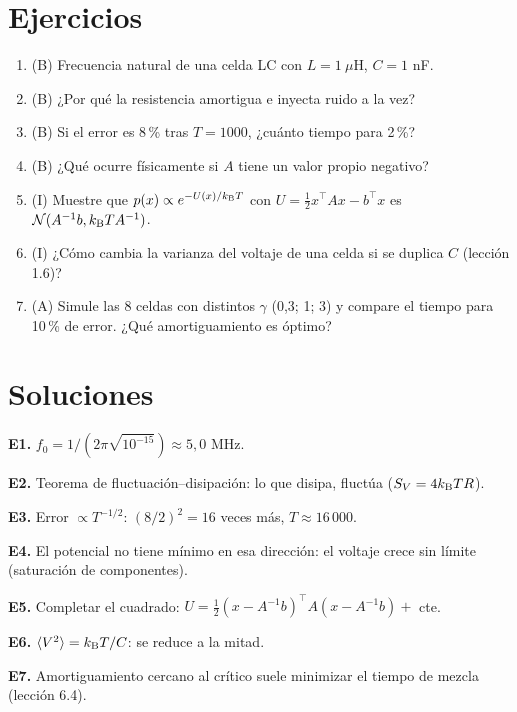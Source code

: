 \documentclass[11pt,a4paper]{article}
\begin{document}
\section{Ejercicios}
\begin{enumerate}[label=\textbf{E\arabic*.}]
\item (B) Frecuencia natural de una celda LC con $L=1\ \mu$H, $C=1$ nF.
\item (B) ¿Por qué la resistencia amortigua e inyecta ruido a la vez?
\item (B) Si el error es 8\,\% tras $T=1000$, ¿cuánto tiempo para 2\,\%?
\item (B) ¿Qué ocurre físicamente si $A$ tiene un valor propio negativo?
\item (I) Muestre que $p(x)\propto e^{-U(x)/k_{\mathrm B} T}$ con $U=\tfrac12x^\top Ax-b^\top x$ es $\mathcal{N}(A^{-1}b,k_{\mathrm B} TA^{-1})$.
\item (I) ¿Cómo cambia la varianza del voltaje de una celda si se duplica $C$ (lección 1.6)?
\item (A) Simule las 8 celdas con distintos $\gamma$ (0,3; 1; 3) y compare el tiempo para 10\,\% de error. ¿Qué amortiguamiento es óptimo?
\end{enumerate}
\section{Soluciones}
\begin{solucion}
\textbf{E1.} $f_0=1/(2\pi\sqrt{10^{-15}})\approx5{,}0$ MHz.

\textbf{E2.} Teorema de fluctuación--disipación: lo que disipa, fluctúa ($S_V=4k_{\mathrm B} TR$).

\textbf{E3.} Error $\propto T^{-1/2}$: $(8/2)^2=16$ veces más, $T\approx16\,000$.

\textbf{E4.} El potencial no tiene mínimo en esa dirección: el voltaje crece sin límite (saturación de componentes).

\textbf{E5.} Completar el cuadrado: $U=\tfrac12(x-A^{-1}b)^\top A(x-A^{-1}b)+$ cte.

\textbf{E6.} $\langle V^2\rangle=k_{\mathrm B} T/C$: se reduce a la mitad.

\textbf{E7.} Amortiguamiento cercano al crítico suele minimizar el tiempo de mezcla (lección 6.4).
\end{solucion}
\end{document}
